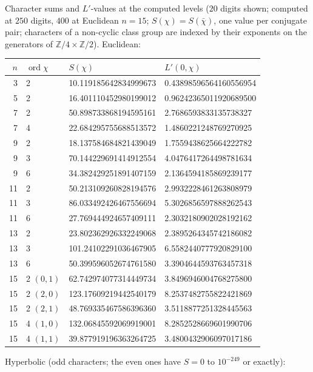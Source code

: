 \documentclass[11pt]{amsart}
\numberwithin{equation}{section}
\theoremstyle{plain}
\theoremstyle{definition}
\theoremstyle{remark}
\newcommand{\Z}{\mathbb{Z}}
\begin{document}
Character sums and $L'$-values at the computed levels ($20$ digits shown;
computed at $250$ digits, $400$ at Euclidean $n = 15$; $S(\chi) =
S(\bar\chi)$, one value per conjugate pair; characters of a non-cyclic
class group are indexed by their exponents on the generators of
$\Z/4\times\Z/2$).  Euclidean:
\begin{center}
\small
\begin{tabular}{@{}rlll@{}}
\toprule
$n$ & $\operatorname{ord}\chi$ & $S(\chi)$ & $L'(0,\chi)$\\
\midrule
3 & 2 & 10.119185642834999673 & 0.43898596564160556954\\
5 & 2 & 16.401110452980199012 & 0.96242365011920689500\\
7 & 2 & 50.898733868194595161 & 2.7686593833135738327\\
7 & 4 & 22.684295755688513572 & 1.4860221248769270925\\
9 & 2 & 18.137584684821439049 & 1.7559438625664222782\\
9 & 3 & 70.144229691414912554 & 4.0476417264498781634\\
9 & 6 & 34.382429251891407159 & 2.1364594185869239177\\
11 & 2 & 50.213109260828194576 & 2.9932228461263808979\\
11 & 3 & 86.033492426467556694 & 5.3026856597888262543\\
11 & 6 & 27.769444924657409111 & 2.3032180902028192162\\
13 & 2 & 23.802362926332249068 & 2.3895264345742186082\\
13 & 3 & 101.24102291036467905 & 6.5582440777920829100\\
13 & 6 & 50.399596052674761580 & 3.3904644593763457318\\
15 & 2 $(0,1)$ & 62.742974077314449734 & 3.8496946004768275800\\
15 & 2 $(2,0)$ & 123.17609219442540179 & 8.2537482755822421869\\
15 & 2 $(2,1)$ & 48.769335467586396360 & 3.5118877251328445563\\
15 & 4 $(1,0)$ & 132.06845592069919001 & 8.2852528669601990706\\
15 & 4 $(1,1)$ & 39.877919196363264725 & 3.4800432906097017186\\
\bottomrule
\end{tabular}
\end{center}
Hyperbolic (odd characters; the even ones have $S = 0$ to $10^{-249}$
or exactly):
\end{document}
